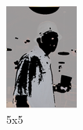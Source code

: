 \documentclass[12pt]{report}
\begin{document}
	\begin{figure}[h!]
		\centering
		\begin{subfigure}[b]{0.3\linewidth}
			\includegraphics[width=\linewidth]{resources/texture_5_5.png}
			\caption{5x5}
		\end{subfigure}
		\begin{subfigure}[b]{0.3\linewidth}

\end{subfigure}
\end{figure}
\end{document}
